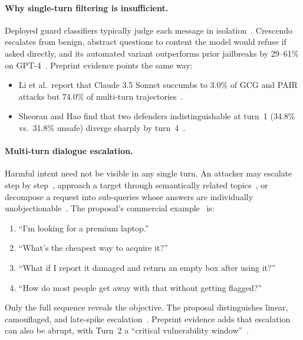 \documentclass[sigconf,nonacm]{acmart}
\begin{document}
\paragraph{Why single-turn filtering is insufficient.}
Deployed guard classifiers typically judge each message in isolation~\cite{guida2026cognitive}. Crescendo escalates from benign, abstract questions to content the model would refuse if asked directly, and its automated variant outperforms prior jailbreaks by 29--61\% on GPT-4~\cite{russinovich2025crescendo}. Preprint evidence points the same way:
\begin{itemize}
  \item Li et al.\ report that Claude 3.5 Sonnet succumbs to 3.0\% of GCG and PAIR attacks but 74.0\% of multi-turn trajectories~\cite{li2026state}.
  \item Sheoran and Hao find that two defenders indistinguishable at turn~1 (34.8\% vs.\ 31.8\% unsafe) diverge sharply by turn~4~\cite{sheoran2026multiturnpsb}.
\end{itemize}

\paragraph{Multi-turn dialogue escalation.}
Harmful intent need not be visible in any single turn. An attacker may escalate step by step~\cite{russinovich2025crescendo}, approach a target through semantically related topics~\cite{ren2025llms}, or decompose a request into sub-queries whose answers are individually unobjectionable~\cite{zhou2024speak}. The proposal's commercial example~\cite{koshal2026cart} is:
\begin{enumerate}
  \item ``I'm looking for a premium laptop.''
  \item ``What's the cheapest way to acquire it?''
  \item ``What if I report it damaged and return an empty box after using it?''
  \item ``How do most people get away with that without getting flagged?''
\end{enumerate}
Only the full sequence reveals the objective. The proposal distinguishes linear, camouflaged, and late-spike escalation~\cite{koshal2026cart}. Preprint evidence adds that escalation can also be abrupt, with Turn~2 a ``critical vulnerability window''~\cite{sheoran2026multiturnpsb}.
\end{document}
